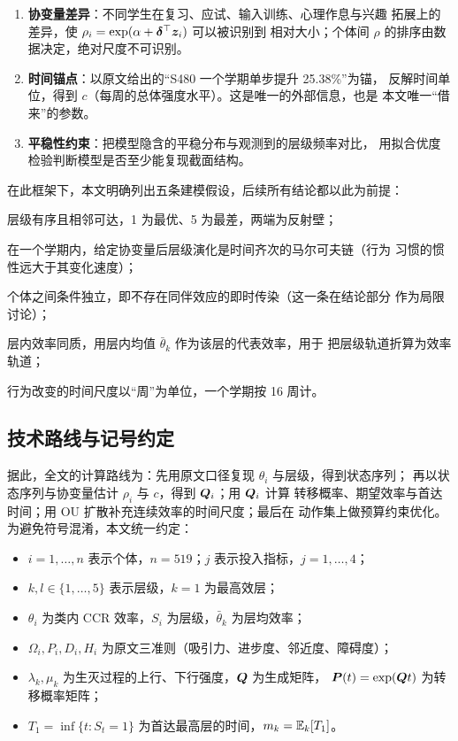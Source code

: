 \begin{enumerate}[label=（\arabic*）,itemsep=2pt,topsep=2pt,leftmargin=3em]
\item \textbf{协变量差异}：不同学生在复习、应试、输入训练、心理作息与兴趣
  拓展上的差异，使 $\rho_i=\exp(\alpha+\bm{\delta}^{\top}\bm{z}_i)$ 可以被识别到
  相对大小；个体间 $\rho$ 的排序由数据决定，绝对尺度不可识别。
\item \textbf{时间锚点}：以原文给出的“S480 一个学期单步提升 25.38\%”为锚，
  反解时间单位，得到 $c$（每周的总体强度水平）。这是唯一的外部信息，也是
  本文唯一“借来”的参数。
\item \textbf{平稳性约束}：把模型隐含的平稳分布与观测到的层级频率对比，
  用拟合优度检验判断模型是否至少能复现截面结构。
\end{enumerate}

在此框架下，本文明确列出五条建模假设，后续所有结论都以此为前提：

\begin{description}[leftmargin=2em,itemsep=1pt,topsep=2pt]
\item[A1] 层级有序且相邻可达，1 为最优、5 为最差，两端为反射壁；
\item[A2] 在一个学期内，给定协变量后层级演化是时间齐次的马尔可夫链（行为
  习惯的惯性远大于其变化速度）；
\item[A3] 个体之间条件独立，即不存在同伴效应的即时传染（这一条在结论部分
  作为局限讨论）；
\item[A4] 层内效率同质，用层内均值 $\bar\theta_k$ 作为该层的代表效率，用于
  把层级轨道折算为效率轨道；
\item[A5] 行为改变的时间尺度以“周”为单位，一个学期按 16 周计。
\end{description}

\subsection{技术路线与记号约定}

据此，全文的计算路线为：先用原文口径复现 $\theta_i$ 与层级，得到状态序列；
再以状态序列与协变量估计 $\rho_i$ 与 $c$，得到 $\bm{Q}_i$；用 $\bm{Q}_i$ 计算
转移概率、期望效率与首达时间；用 OU 扩散补充连续效率的时间尺度；最后在
动作集上做预算约束优化。为避免符号混淆，本文统一约定：

\begin{itemize}[leftmargin=2em,itemsep=1pt,topsep=2pt]
\item $i=1,\dots,n$ 表示个体，$n=519$；$j$ 表示投入指标，$j=1,\dots,4$；
\item $k,l\in\{1,\dots,5\}$ 表示层级，$k=1$ 为最高效层；
\item $\theta_i$ 为类内 CCR 效率，$S_i$ 为层级，$\bar\theta_k$ 为层均效率；
\item $\Omega_i,P_i,D_i,H_i$ 为原文三准则（吸引力、进步度、邻近度、障碍度）；
\item $\lambda_k,\mu_k$ 为生灭过程的上行、下行强度，$\bm{Q}$ 为生成矩阵，
  $\bm{P}(t)=\exp(\bm{Q} t)$ 为转移概率矩阵；
\item $T_1=\inf\{t:S_t=1\}$ 为首达最高层的时间，$m_k=\mathbb{E}_k[T_1]$。
\end{itemize}
